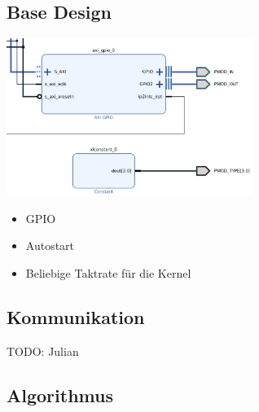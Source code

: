 \documentclass{beamer}
\begin{document}
\subsection{Base Design}
\begin{frame}{\subsecname}
\begin{center}
\includegraphics[width=8cm]{images/base_design.png}
\end{center}
\begin{itemize}
\item{GPIO}
\item{Autostart}
\item{Beliebige Taktrate für die Kernel}
\end{itemize}
\end{frame}

\subsection{Kommunikation}
\begin{frame}{\subsecname}

TODO: Julian

\end{frame}

\subsection{Algorithmus}
\end{document}
